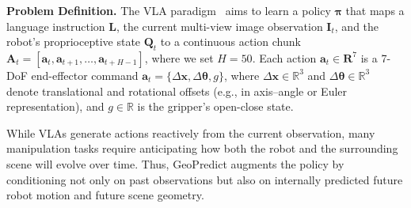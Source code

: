 \textbf{Problem Definition.}
%
%
The VLA paradigm~\cite{kim2025openvla,black2410pi0} aims to learn a policy $\bm{\pi}$ that maps a language instruction $\mathbf{L}$, the current multi-view image observation $\mathbf{I}_t$, and the robot’s proprioceptive state $\mathbf{Q}_t$ to a continuous action chunk $\mathbf{A}_t=[\mathbf{a}_t, \mathbf{a}_{t+1}, \ldots, \mathbf{a}_{t+H-1}]$, where we set $H=50$. 
Each action $\mathbf{a}_t \in \mathbf{R}^{7}$ is a 7-DoF end-effector command $\mathbf{a}_t=\{\Delta\mathbf{x}, \Delta\bm{\theta}, g\}$,
where $\Delta\mathbf{x}\in\mathbb{R}^3$ and $\Delta\bm{\theta}\in\mathbb{R}^3$ denote translational and rotational offsets (e.g., in axis–angle or Euler representation), and $g\in\mathbb{R}$ is the gripper's open-close state.


While  VLAs generate actions reactively from the current observation, many manipulation tasks require anticipating how both the robot and the surrounding scene will evolve over time. Thus, GeoPredict augments the policy by conditioning not only on past observations but also on internally predicted future robot motion and future scene geometry.

